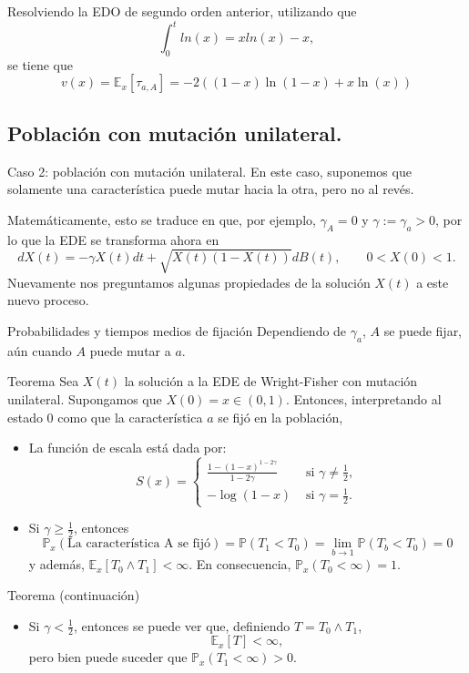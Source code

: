 \documentclass{beamer}
\renewcommand{\to}{\rightarrow}
\newcommand{\E}{\mathbb{E}}
\renewcommand{\P}{\mathbb{P}}
\renewcommand{\1}{\mathds{1}}
\theoremstyle{definition}
\theoremstyle{definition}
\theoremstyle{definition}
\theoremstyle{definition}
\theoremstyle{definition}
\begin{document}
\begin{frame}
    Resolviendo la EDO de segundo orden anterior, utilizando que 
    \[
    \int_0^{t}ln(x)= xln(x)-x,     
    \]
    se tiene que 
    \[
    v(x)=\E_x\left[\tau_{a,A}\right]=-2((1-x)\ln(1-x)+x\ln(x))    
    \]
\end{frame}
\subsection{Población con mutación unilateral.}
\begin{frame}{Caso 2: población con mutación unilateral.}
    En este caso, suponemos que solamente una característica puede mutar hacia la otra, pero no al revés.
    \newline

    Matemáticamente, esto se traduce en que, por ejemplo, $\gamma_A=0$ y $\gamma:=\gamma_a>0$, por lo que la EDE se transforma ahora 
    en 
    \[
    dX(t)=-\gamma X(t)dt+\sqrt{X(t)(1-X(t))}dB(t), \qquad 0<X(0)<1.  
    \]
    Nuevamente nos preguntamos algunas propiedades de la solución $X(t)$ a este nuevo proceso.
\end{frame}
\begin{frame}{Probabilidades y tiempos medios de fijación}
    Dependiendo de $\gamma_a$, $A$ se puede fijar, aún cuando $A$ puede mutar a $a$. 
    \begin{block}{Teorema}
        Sea $X(t)$ la solución a la EDE de Wright-Fisher con mutación unilateral. Supongamos que $X(0)=x \in (0,1)$.
        Entonces, interpretando al estado 0 como que la característica $a$ se fijó en la población,
        \begin{itemize}
            \item La función de escala está dada por: 
            \[
            S(x)=\begin{cases}
                \frac{1-(1-x)^{1-2\gamma}}{1-2\gamma} & \text{ si } \gamma\neq\frac{1}{2},\\
                -\log(1-x) & \text{ si } \gamma=\frac{1}{2}.
            \end{cases}
            \]
            \item Si $\gamma\geq \frac{1}{2}$, entonces 
            \[
                \P_x(\text{La característica A se fijó})=\P\left(T_1<T_0\right)=\lim_{b\to 1}\P\left(T_b< T_0\right)=0
            \]
            y además, $\E_x\left[T_0\wedge T_1\right]<\infty$. En consecuencia, $\P_x\left(T_0<\infty\right)=1$. 
        \end{itemize}
    \end{block}
\end{frame}
\begin{frame}{}
    \begin{block}{Teorema (continuación)}
        \begin{itemize}
            \item Si $\gamma<\frac{1}{2}$, entonces se puede ver que, definiendo $T=T_0\wedge T_1$, 
            \[
            \E_x\left[T\right]<\infty,    
            \]
            pero bien puede suceder que $\P_x\left(T_1<\infty\right)>0$.
        \end{itemize}
    \end{block}
\end{frame}
\end{document}
